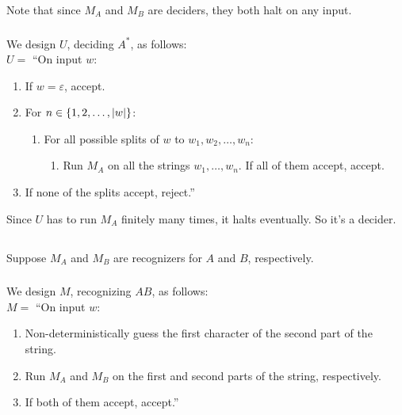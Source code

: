 \documentclass{article}
\begin{document}
Note that since \(M_A\) and \(M_B\) are deciders, they both halt on any input.

\subsubsection{}
We design \(U\), deciding \(A^*\), as follows:\\
\(U = \) ``On input \(w\):
\begin{enumerate}
\item If \(w = \varepsilon\), accept.
\item For \(n\in \left\{1, 2, \ldots, \vert w\vert\right\}\):
    \begin{enumerate}
        \item[] For all possible splits of \(w\) to \(w_1, w_2, \ldots, w_n\):
        \begin{enumerate}
            \item[] Run \(M_A\) on all the strings \(w_1, \ldots, w_n\). If all of them accept, accept.
        \end{enumerate}
    \end{enumerate}
\item If none of the splits accept, reject.''
\end{enumerate}

Since \(U\) has to run \(M_A\) finitely many times, it halts eventually. So it's a decider.

\subsection{}
Suppose \(M_A\) and \(M_B\) are recognizers for \(A\) and \(B\), respectively.

\subsubsection{}
We design \(M\), recognizing \(AB\), as follows:\\
\(M = \) ``On input \(w\):
\begin{enumerate}
\item Non-deterministically guess the first character of the second part of the string.
\item Run \(M_A\) and \(M_B\) on the first and second parts of the string, respectively.
\item If both of them accept, accept.''
\end{enumerate}
\end{document}
